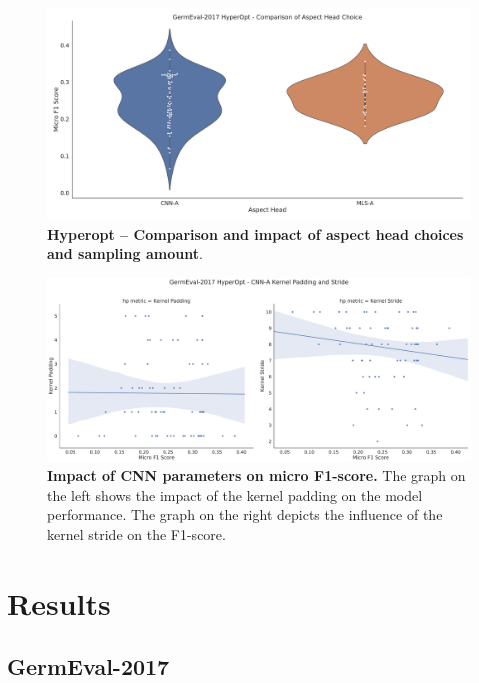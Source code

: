 \begin{figure}[H]
    \centering
    \includegraphics[width=\textwidth]{figures/06_results/06_hp_ge_vio_aspectHead_test}
    \caption{\textbf{Hyperopt -- Comparison and impact of aspect head choices and sampling amount}.}
    \label{fig:06_ge_aspectHeadChoices}
\end{figure}

\begin{figure}[H]
    \centering
    \includegraphics[width=\textwidth]{figures/06_results/06_hp_ge_lm_cnnParams2_test}
    \caption{\textbf{Impact of CNN parameters on micro F1-score.} The graph on the left shows the impact of the kernel padding on the model performance. The graph on the right depicts the influence of the kernel stride on the F1-score.}
    \label{fig:06_HpOptim_CnnParams2}
\end{figure}

\section{Results}

\subsection{GermEval-2017}

